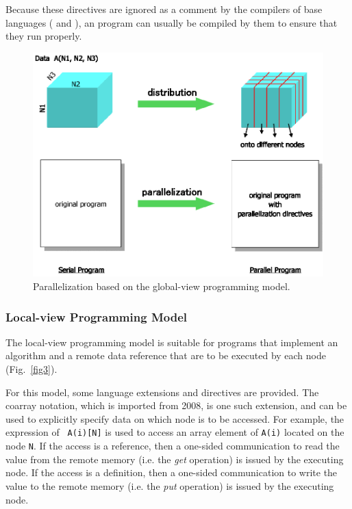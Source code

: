 Because these
directives are ignored as a comment by the 
compilers of base languages ({\Fort} and {\C}), an {\XMP} program can
usually be compiled by them to ensure that they run properly.

\begin{figure}
  \centering
  \includegraphics[width=12cm]{figs/Fig2.eps}
  \caption{Parallelization based on the global-view programming model.}
\label{fig2}
\end{figure}


\subsubsection{Local-view Programming Model}

The local-view programming model is suitable for programs that
implement an algorithm and a remote data reference that are to
be executed by each node (Fig.~\ref{fig3}).

For this model, some language extensions and 
directives are provided. The coarray notation, which is imported from
{\Fort} 2008,
is one such extension, and can be used to explicitly specify data on which node 
is to be accessed. For example, the expression of {\tt
A(i)[N]} is used to access an array element of {\tt A(i)} located on the
node {\tt N}.
%
If the access is a reference, then a one-sided communication to read the
value from the remote memory (i.e. the {\it get} operation) is issued
by the executing node.
If the access is a definition, then a one-sided communication to write
the value to the remote memory (i.e. the {\it put} operation) is issued by
the executing node.

